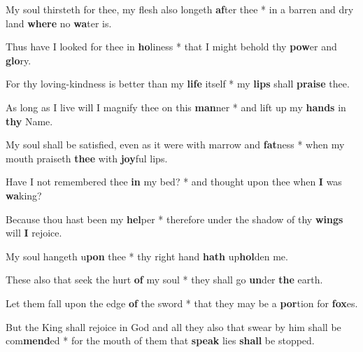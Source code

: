 \begin{multicols}{2}
	My soul thirsteth for thee, my flesh also longeth \textbf{af}ter thee * in a barren and dry land \textbf{where} no \textbf{wa}ter is.

	Thus have I looked for thee in \textbf{ho}liness * that I might behold thy \textbf{pow}er and \textbf{glo}ry.
	
	For thy loving-kindness is better than my \textbf{life} itself * my \textbf{lips} shall \textbf{praise} thee.
	
	As long as I live will I magnify thee on this \textbf{man}ner * and lift up my \textbf{hands} in \textbf{thy} Name.
	
	My soul shall be satisfied, even as it were with marrow and \textbf{fat}ness * when my mouth praiseth \textbf{thee} with \textbf{joy}ful lips.
	
	Have I not remembered thee \textbf{in} my bed? * and thought upon thee when \textbf{I} was \textbf{wa}king?
	
	Because thou hast been my \textbf{hel}per * therefore under the shadow of thy \textbf{wings} will \textbf{I} rejoice.
	
	My soul hangeth u\textbf{pon} thee * thy right hand \textbf{hath} up\textbf{hol}den me.
	
	These also that seek the hurt \textbf{of} my soul * they shall go \textbf{un}der \textbf{the} earth.
	
	Let them fall upon the edge \textbf{of} the sword * that they may be a \textbf{por}tion for \textbf{fox}es.
	
	But the King shall rejoice in God and all they also that swear by him shall be com\textbf{mend}ed * for the mouth of them that \textbf{speak} lies \textbf{shall} be stopped.
\end{multicols}